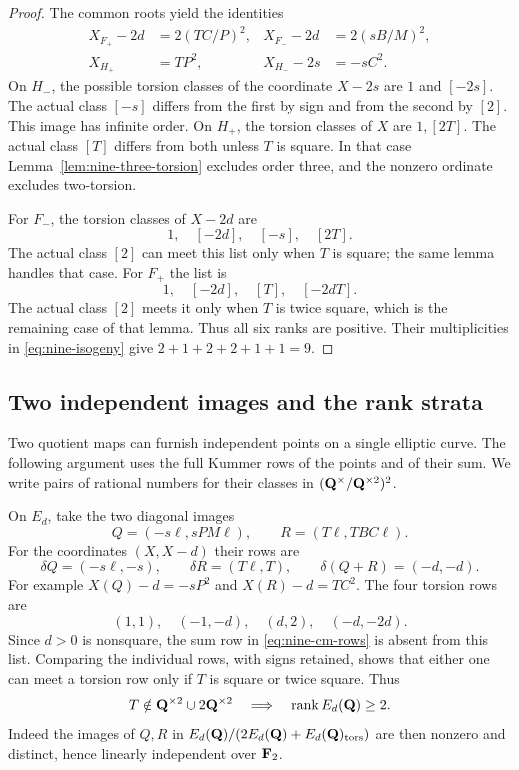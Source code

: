 \begin{proof}
The common roots yield the identities
\begin{equation}\label{eq:nine-point-kummer}
\begin{aligned}
 X_{F_+}-2d&=2(TC/P)^2,&
 X_{F_-}-2d&=2(sB/M)^2,\\
 X_{H_+}&=TP^2,&
 X_{H_-}-2s&=-sC^2.
\end{aligned}
\end{equation}
On $H_-$, the possible torsion classes of the coordinate $X-2s$
are $1$ and $[-2s]$.  The actual class $[-s]$ differs from the first
by sign and from the second by $[2]$.  This image has infinite order.
On $H_+$, the torsion classes of $X$ are $1,[2T]$.
The actual class $[T]$ differs from both unless $T$ is square.
In that case Lemma~\ref{lem:nine-three-torsion} excludes order three,
and the nonzero ordinate excludes two-torsion.

For $F_-$, the torsion classes of $X-2d$ are
\[
 1,\quad[-2d],\quad[-s],\quad[2T].
\]
The actual class $[2]$ can meet this list only when $T$ is square;
the same lemma handles that case.  For $F_+$ the list is
\[
 1,\quad[-2d],\quad[T],\quad[-2dT].
\]
The actual class $[2]$ meets it only when $T$ is twice square,
which is the remaining case of that lemma.  Thus all six ranks are
positive.  Their multiplicities in \eqref{eq:nine-isogeny} give
$2+1+2+2+1+1=9$.
\end{proof}

\subsection{Two independent images and the rank strata}

Two quotient maps can furnish independent points on a single elliptic
curve.  The following argument uses the full Kummer rows of the points
and of their sum.  We write pairs of rational numbers for their classes
in $(\mathbf Q^\times/\mathbf Q^{\times2})^2$.

On $E_d$, take the two diagonal images
\[
 Q=(-s\ell,sPM\ell),\qquad R=(T\ell,TBC\ell).
\]
For the coordinates $(X,X-d)$ their rows are
\begin{equation}\label{eq:nine-cm-rows}
 \delta Q=(-s\ell,-s),\qquad
 \delta R=(T\ell,T),\qquad
 \delta(Q+R)=(-d,-d).
\end{equation}
For example $X(Q)-d=-sP^2$ and $X(R)-d=TC^2$.
The four torsion rows are
\begin{equation}\label{eq:nine-cm-torsion}
 (1,1),\quad(-1,-d),\quad(d,2),\quad(-d,-2d).
\end{equation}
Since $d>0$ is nonsquare, the sum row in
\eqref{eq:nine-cm-rows} is absent from this list.
Comparing the individual rows, with signs retained, shows that either
one can meet a torsion row only if $T$ is square or twice square.
Thus
\begin{equation}\label{eq:nine-cm-two}
 T\notin\mathbf Q^{\times2}\cup2\mathbf Q^{\times2}
 \quad\Longrightarrow\quad \operatorname{rank} E_d(\mathbf Q)\ge2.
\end{equation}
Indeed the images of $Q,R$ in
$E_d(\mathbf Q)/(2E_d(\mathbf Q)+E_d(\mathbf Q)_{\mathrm{tors}})$ are then nonzero and
distinct, hence linearly independent over $\mathbf F_2$.

